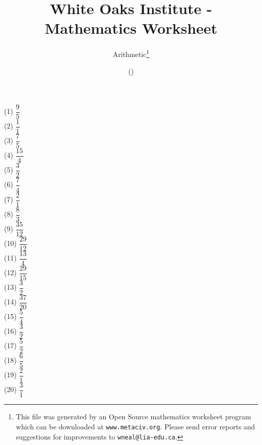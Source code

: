 \documentclass[letter]{article}
\begin{document}
\title{White Oaks Institute - Mathematics Worksheet}
\author{Arithmetic\thanks{This file was generated by an \textsf{Open Source} mathematics worksheet program which can be downloaded at \texttt{www.metaciv.org}. Please send error reports and suggestions for improvements to \texttt{wneal@lia-edu.ca}.}}
\date{\XCfileversion{} (\XCfiledate)}
\maketitle
\setlength{\parskip}{12mm plus 4mm minus 4mm}\setlength{\parindent}{0cm}\begin{multicols}{2}(1) $\dfrac{9}{5}$\\(2) $\dfrac{1}{1}$\\(3) $\dfrac{7}{5}$\\(4) $\dfrac{15}{4}$\\(5) $\dfrac{3}{2}$\\(6) $\dfrac{7}{4}$\\(7) $\dfrac{2}{1}$\\(8) $\dfrac{8}{3}$\\(9) $\dfrac{35}{12}$\\(10) $\dfrac{29}{12}$\\(11) $\dfrac{13}{4}$\\(12) $\dfrac{29}{15}$\\(13) $\dfrac{3}{2}$\\(14) $\dfrac{37}{20}$\\(15) $\dfrac{5}{4}$\\(16) $\dfrac{3}{2}$\\(17) $\dfrac{5}{2}$\\(18) $\dfrac{6}{5}$\\(19) $\dfrac{2}{1}$\\(20) $\dfrac{3}{1}$\\\end{multicols}
\end{document}
